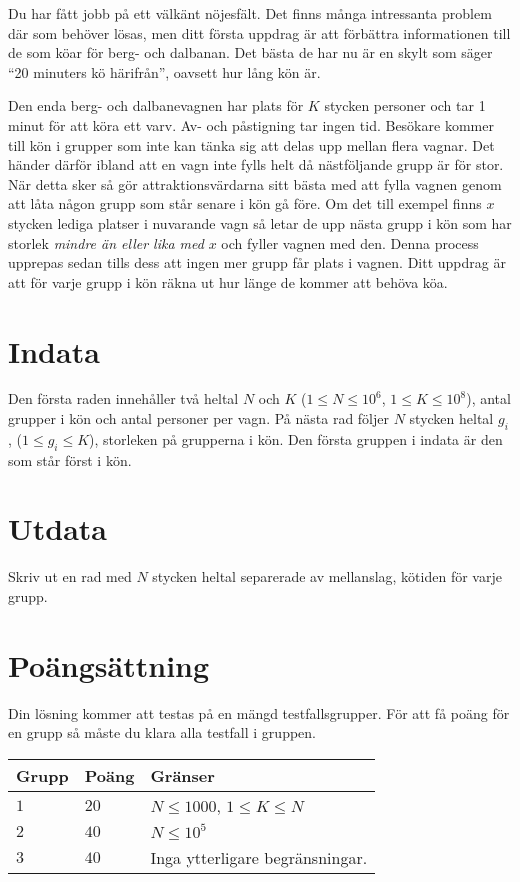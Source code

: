 Du har fått jobb på ett välkänt nöjesfält. Det finns många intressanta problem där som behöver lösas, men ditt första uppdrag är att förbättra informationen till de som köar för berg- och dalbanan. Det bästa de har nu är en skylt som säger ``20 minuters kö härifrån'', oavsett hur lång kön är.

Den enda berg- och dalbanevagnen har plats för $K$ stycken personer och tar 1 minut för att köra ett varv. Av- och påstigning tar ingen tid. Besökare kommer till kön i grupper som inte kan tänka sig att delas upp mellan flera vagnar. Det händer därför ibland att en vagn inte fylls helt då nästföljande grupp är för stor. När detta sker så gör attraktionsvärdarna sitt bästa med att fylla vagnen genom att låta någon grupp som står senare i kön gå före. Om det till exempel finns $x$ stycken lediga platser i nuvarande vagn så letar de upp nästa grupp i kön som har storlek \emph{mindre än eller lika med} $x$ och fyller vagnen med den. Denna process upprepas sedan tills dess att ingen mer grupp får plats i vagnen. Ditt uppdrag är att för varje grupp i kön räkna ut hur länge de kommer att behöva köa.

\section*{Indata}
Den första raden innehåller två heltal $N$ och $K$ ($1 \leq N \leq 10^6$, $1 \leq K \leq 10^8$), antal
grupper i kön och antal personer per vagn. På nästa rad följer $N$ stycken heltal $g_i$, ($1 \leq g_i \leq K$),
storleken på grupperna i kön. Den första gruppen i indata är den som står först i kön.

\section*{Utdata}
Skriv ut en rad med $N$ stycken heltal separerade av mellanslag, kötiden för varje grupp.

\section*{Poängsättning}
Din lösning kommer att testas på en mängd testfallsgrupper.
För att få poäng för en grupp så måste du klara alla testfall i gruppen.


\noindent
\begin{tabular}{| l | l | p{12cm} |}
  \hline
  \textbf{Grupp} & \textbf{Poäng} & \textbf{Gränser} \\ \hline
  $1$    & $20$       & $N \leq 1000$, $1 \leq K \leq N$ \\ \hline
  $2$    & $40$       & $N \leq 10^5$ \\ \hline
  $3$    & $40$       & Inga ytterligare begränsningar. \\ \hline
\end{tabular}


